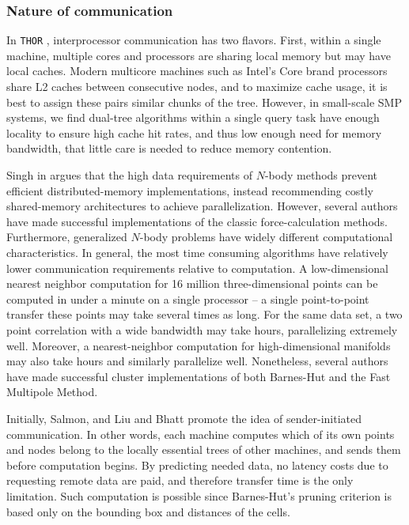 \documentclass[twoside,leqno,twocolumn]{article}
\newcommand{\THOR}{{{\tt THOR}} }
\newcommand{\mysubsub}[1]{\subsubsection{#1} }
\begin{document}
\mysubsub{Nature of communication}

In \THOR, interprocessor communication has two flavors.
First, within a single machine, multiple cores and processors are sharing local memory but may have local caches.
Modern multicore machines such as Intel's Core brand processors share L2 caches between consecutive nodes, and to maximize cache usage, it is best to assign these pairs similar chunks of the tree.
However, in small-scale SMP systems, we find dual-tree algorithms within a single query task have enough locality to ensure high cache hit rates, and thus low enough need for memory bandwidth, that little care is needed to reduce memory contention.

Singh in \cite{singh_thesis} argues that the high data requirements of $N$-body methods prevent efficient distributed-memory implementations, instead recommending costly shared-memory architectures to achieve parallelization.
However, several authors \cite{salmon_thesis, liu94experiences, salmon97parallel} have made successful implementations of the classic force-calculation methods.
Furthermore, generalized $N$-body problems have widely different computational characteristics.
In general, the most time consuming algorithms have relatively lower communication requirements relative to computation.
A low-dimensional nearest neighbor computation for 16 million three-dimensional points can be computed in under a minute on a single processor -- a single point-to-point transfer these points may take several times as long.
For the same data set, a two point correlation with a wide bandwidth may take hours, parallelizing extremely well.
Moreover, a nearest-neighbor computation for high-dimensional manifolds may also take hours and similarly parallelize well.
Nonetheless, several authors have made successful cluster implementations of both Barnes-Hut and the Fast Multipole Method.

Initially, Salmon\cite{salmon_thesis}, and Liu and Bhatt\cite{liu94experiences} promote the idea of sender-initiated communication.
In other words, each machine computes which of its own points and nodes belong to the locally essential trees of other machines, and sends them before computation begins.
By predicting needed data, no latency costs due to requesting remote data are paid, and therefore transfer time is the only limitation.
Such computation is possible since Barnes-Hut's pruning criterion is based only on the bounding box and distances of the cells.
\end{document}
